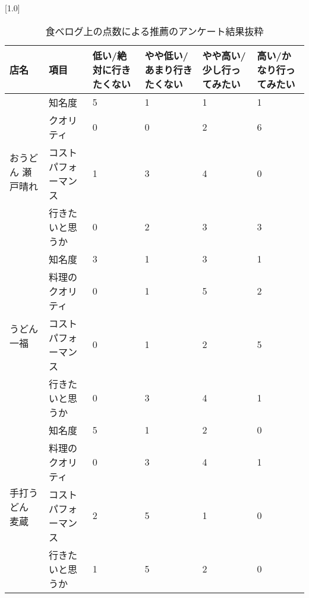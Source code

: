 \begin{table}[H]
\centering
\caption{食べログ上の点数による推薦のアンケート結果抜粋}
\label{table:questionnaire:rank}
\small
\scalebox{0.7}[1.0]{
\begin{tabular}{|l|l|l|l|l|l|}
\hline
店名 & 項目 & 低い/絶対に行きたくない & やや低い/あまり行きたくない & やや高い/少し行ってみたい & 高い/かなり行ってみたい \\ \hline
\multirow{4}{*}{おうどん 瀬戸晴れ} & 知名度 & 5 & 1 & 1 & 1 \\ \cline{2-6}
 & クオリティ & 0 & 0 & 2 & 6 \\ \cline{2-6}
 & コストパフォーマンス & 1 & 3 & 4 & 0 \\ \cline{2-6}
 & 行きたいと思うか & 0 & 2 & 3 & 3 \\ \hline
\multirow{4}{*}{うどん 一福} & 知名度 & 3 & 1 & 3 & 1 \\ \cline{2-6}
 & 料理のクオリティ & 0 & 1 & 5 & 2 \\ \cline{2-6}
 & コストパフォーマンス & 0 & 1 & 2 & 5 \\ \cline{2-6}
 & 行きたいと思うか & 0 & 3 & 4 & 1 \\ \hline
\multirow{4}{*}{手打うどん 麦蔵} & 知名度 & 5 & 1 & 2 & 0 \\ \cline{2-6}
 & 料理のクオリティ & 0 & 3 & 4 & 1 \\ \cline{2-6}
 & コストパフォーマンス & 2 & 5 & 1 & 0 \\ \cline{2-6}
 & 行きたいと思うか & 1 & 5 & 2 & 0 \\ \hline
\end{tabular}
}
\end{table}
